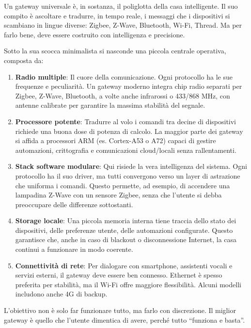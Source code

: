Un gateway universale è, in sostanza, il poliglotta della casa intelligente. Il suo compito è ascoltare e tradurre, in tempo reale, i messaggi che i dispositivi si scambiano in lingue diverse: Zigbee, Z-Wave, Bluetooth, Wi-Fi, Thread. Ma per farlo bene, deve essere costruito con intelligenza e precisione.

Sotto la sua scocca minimalista si nasconde una piccola centrale operativa, composta da:

\begin{enumerate}
    \item \textbf{Radio multiple}: Il cuore della comunicazione. Ogni protocollo ha le sue frequenze e peculiarità. Un gateway moderno integra chip radio separati per Zigbee, Z-Wave, Bluetooth, a volte anche infrarossi o 433/868 MHz, con antenne calibrate per garantire la massima stabilità del segnale.
    
    \item \textbf{Processore potente}: Tradurre al volo i comandi tra decine di dispositivi richiede una buona dose di potenza di calcolo. La maggior parte dei gateway si affida a processori ARM (es. Cortex-A53 o A72) capaci di gestire automazioni, crittografia e comunicazioni cloud/locali senza rallentamenti.
    
    \item \textbf{Stack software modulare}: Qui risiede la vera intelligenza del sistema. Ogni protocollo ha il suo driver, ma tutti convergono verso un layer di astrazione che uniforma i comandi. Questo permette, ad esempio, di accendere una lampadina Z-Wave con un sensore Zigbee, senza che l’utente si debba preoccupare delle differenze sottostanti.
    
    \item \textbf{Storage locale}: Una piccola memoria interna tiene traccia dello stato dei dispositivi, delle preferenze utente, delle automazioni configurate. Questo garantisce che, anche in caso di blackout o disconnessione Internet, la casa continui a funzionare in modo coerente.
    
    \item \textbf{Connettività di rete}: Per dialogare con smartphone, assistenti vocali e servizi esterni, il gateway deve essere ben connesso. Ethernet è spesso preferita per stabilità, ma il Wi-Fi offre maggiore flessibilità. Alcuni modelli includono anche 4G di backup.
\end{enumerate}

L’obiettivo non è solo far funzionare tutto, ma farlo con discrezione. Il miglior gateway è quello che l’utente dimentica di avere, perché tutto “funziona e basta”.


